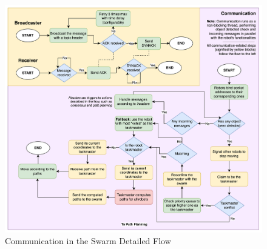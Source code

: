 \begin{figure}[H]
    \centering
    \includegraphics[width=0.9\linewidth]{assets/images/communication/communication-flow.png}
    \caption{Communication in the Swarm Detailed Flow}
    \label{fig:communication-flow}
\end{figure}
